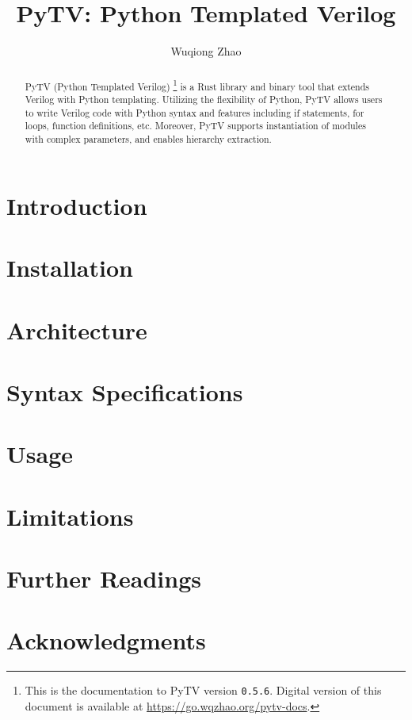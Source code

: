 \documentclass{article}
\title{PyTV: Python Templated Verilog}
\author{Wuqiong Zhao}
\newcommand{\pytvversion}{0.5.6}
\begin{document}
\maketitle

\begin{abstract}
  PyTV (Python Templated Verilog)%
  \footnote{This is the documentation to PyTV version \texttt{\pytvversion{}}.
  Digital version of this document is available at \url{https://go.wqzhao.org/pytv-docs}.}
  is a Rust library and binary tool that extends Verilog with Python templating.
  Utilizing the flexibility of Python,
  PyTV allows users to write Verilog code with Python syntax and features
  including if statements, for loops, function definitions, etc.
  Moreover, PyTV supports instantiation of modules with complex parameters,
  and enables hierarchy extraction.
\end{abstract}

\tableofcontents

\section{Introduction}\label{sec:introduction}


\section{Installation}\label{sec:installation}


\section{Architecture}\label{sec:architecture}


\section{Syntax Specifications}\label{sec:syntax}


\section{Usage}\label{sec:usage}


\section{Limitations}\label{sec:limitations}


\section*{Further Readings}


\section*{Acknowledgments}



{}
\bgroup
\small

\egroup
\end{document}
